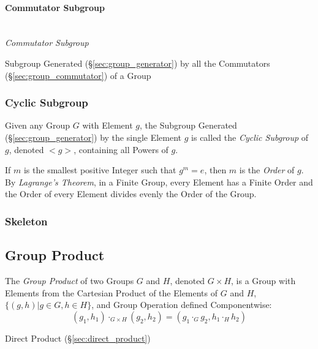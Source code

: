 \paragraph{Commutator Subgroup}\label{sec:commutator_subgroup}
\hfill \\

\emph{Commutator Subgroup}

Subgroup Generated (\S\ref{sec:group_generator}) by all the
Commutators (\S\ref{sec:group_commutator}) of a Group



\subsubsection{Cyclic Subgroup}\label{sec:cyclic_subgroup}

Given any Group $G$ with Element $g$, the Subgroup Generated
(\S\ref{sec:group_generator}) by the single Element $g$ is called the
\emph{Cyclic Subgroup} of $g$, denoted $<g>$, containing all Powers of
$g$.

If $m$ is the smallest positive Integer such that $g^m = e$, then $m$
is the \emph{Order} of $g$. By \emph{Lagrange's Theorem}, in a Finite
Group, every Element has a Finite Order and the Order of every Element
divides evenly the Order of the Group.



\subsubsection{Skeleton}\label{sec:group_skeleton}



\subsection{Group Product}\label{sec:group_product}

The \emph{Group Product} of two Groups $G$ and $H$, denoted $G \times
H$, is a Group with Elements from the Cartesian Product of the
Elements of $G$ and $H$, $\{(g,h) | g \in G, h \in H\}$, and Group
Operation defined Componentwise:
\[
    (g_1, h_1) \cdot_{G \times H} (g_2, h_2)
    = (g_1 \cdot_G g_2, h_1 \cdot_H h_2)
\]

Direct Product (\S\ref{sec:direct_product})



